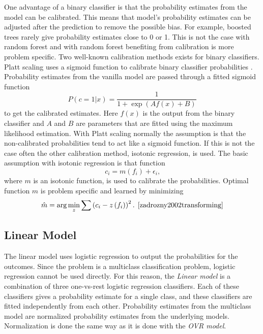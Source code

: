 One advantage of a binary classifier is that the probability estimates from the model can be calibrated. This means that model's probability estimates can be adjusted after the prediction to remove the possible bias. For example, boosted trees rarely give probability estimates close to 0 or 1. This is not the case with random forest and with random forest benefiting from calibration is more problem specific. \cite{niculescu2005predicting} Two well-known calibration methods exists for binary classifiers. Platt scaling uses a sigmoid function to calibrate binary classifier probabilities \cite{platt1999probabilistic}. Probability estimates from the vanilla model are passed through a fitted sigmoid function
\begin{equation}
P ( c = 1 | x ) = \frac { 1 } { 1 + \exp ( A f(x) + B ) }
\end{equation}
to get the calibrated estimates. Here $f(x)$ is the output from the binary classifier and $A$ and $B$ are parameters that are fitted using the maximum likelihood estimation. With Platt scaling normally the assumption is that the non-calibrated probabilities tend to act like a sigmoid function. If this is not the case often the other calibration method, isotonic regression, is used. The basic assumption with isotonic regression is that function
\begin{equation}
c _ { i } = m \left( f _ { i } \right) + \epsilon _ { i } \text{,}
\end{equation}
where $m$ is an isotonic function, is used to calibrate the probabilities. Optimal function $m$ is problem specific and learned by minimizing
\begin{equation}
\hat { m } = \arg \min _ { z } \sum \left( c _ { i } - z \left( f _ { i } \right) \right) ^ { 2 } \text{. \cite{zadrozny2002transforming}}
\end{equation}

\subsection{Linear Model}
The linear model uses logistic regression to output the probabilities for the outcomes. Since the problem is a multiclass classification problem, logistic regression cannot be used directly. For this reason, the \textit{Linear model} is a combination of three one-vs-rest logistic regression classifiers. Each of these classifiers gives a probability estimate for a single class, and these classifiers are fitted independently from each other. Probability estimates from the multiclass model are normalized probability estimates from the underlying models. Normalization is done the same way as it is done with the \textit{OVR model}.

